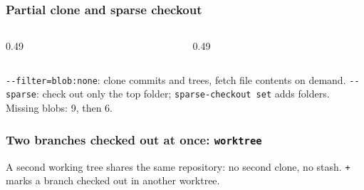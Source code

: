 \documentclass[aspectratio=169,10pt,compress]{beamer}
\begin{document}
\begin{frame}[t,fragile] \frametitle{Partial clone and sparse checkout}
  \begin{columns}[T]
    \begin{column}{0.49\textwidth}
    \end{column}
    \begin{column}{0.49\textwidth}
    \end{column}
  \end{columns}

  \vspace{0.1em}
  \small
  \texttt{-{}-filter=blob:none}: clone commits and trees, fetch file contents on demand. \texttt{-{}-sparse}: check out only the top
  folder; \texttt{sparse-checkout set} adds folders. Missing blobs: 9, then 6.
\end{frame}




\begin{frame}[t,fragile] \frametitle{Two branches checked out at once: \texttt{worktree}}

  \vspace{0.1em}
  \small
  A second working tree shares the same repository: no second clone, no stash. \texttt{+} marks a branch checked out in another worktree.
\end{frame}

\end{document}
